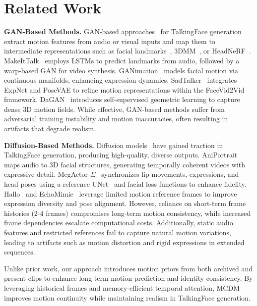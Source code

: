 \section{Related Work}
\textbf{GAN-Based Methods.}  
GAN-based approaches~\cite{kim2018deep, zhou2020makelttalk, pumarola2018ganimation, vougioukas2020realistic, zhang2023sadtalker, wang2021one, hong2022depth, chan2022efficient, guo2024liveportrait} for TalkingFace generation extract motion features from audio or visual inputs and map them to intermediate representations such as facial landmarks~\cite{yang2023effective}, 3DMM~\cite{sun2023vividtalk}, or HeadNeRF~\cite{hong2022headnerf}. MakeItTalk~\cite{zhou2020makelttalk} employs LSTMs to predict landmarks from audio, followed by a warp-based GAN for video synthesis. GANimation~\cite{pumarola2018ganimation} models facial motion via continuous manifolds, enhancing expression dynamics. SadTalker~\cite{zhang2023sadtalker} integrates ExpNet and PoseVAE to refine motion representations within the FaceVid2Vid~\cite{wang2021one} framework. DaGAN~\cite{hong2022depth} introduces self-supervised geometric learning to capture dense 3D motion fields. While effective, GAN-based methods suffer from adversarial training instability and motion inaccuracies, often resulting in artifacts that degrade realism.

\textbf{Diffusion-Based Methods.}  
Diffusion models~\cite{rombach2022high} have gained traction in TalkingFace generation, producing high-quality, diverse outputs. AniPortrait~\cite{wei2024aniportrait} maps audio to 3D facial structures, generating temporally coherent videos with expressive detail. MegActor-$\Sigma$~\cite{wang2024v} synchronizes lip movements, expressions, and head poses using a reference UNet~\cite{hu2024animate} and facial loss functions to enhance fidelity. Hallo~\cite{xu2024hallo} and EchoMimic~\cite{chen2024echomimic} leverage limited motion reference frames to improve expression diversity and pose alignment. However, reliance on short-term frame histories ($2$-$4$ frames) compromises long-term motion consistency, while increased frame dependencies escalate computational costs. Additionally, static audio features and restricted references fail to capture natural motion variations, leading to artifacts such as motion distortion and rigid expressions in extended sequences.

Unlike prior work, our approach introduces motion priors from both archived and present clips to enhance long-term motion prediction and identity consistency. By leveraging historical frames and memory-efficient temporal attention, MCDM improves motion continuity while maintaining realism in TalkingFace generation.